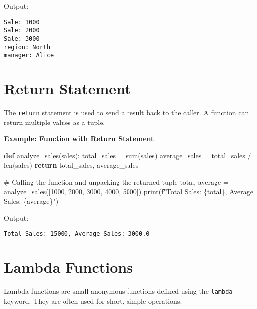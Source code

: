 \documentclass[
  letterpaper,
  DIV=11,
  numbers=noendperiod]{scrreprt}
\newenvironment{Shaded}{\begin{snugshade}}{\end{snugshade}}
\newcommand{\BuiltInTok}[1]{\textcolor[rgb]{0.00,0.23,0.31}{#1}}
\newcommand{\CommentTok}[1]{\textcolor[rgb]{0.37,0.37,0.37}{#1}}
\newcommand{\ControlFlowTok}[1]{\textcolor[rgb]{0.00,0.23,0.31}{\textbf{#1}}}
\newcommand{\DecValTok}[1]{\textcolor[rgb]{0.68,0.00,0.00}{#1}}
\newcommand{\KeywordTok}[1]{\textcolor[rgb]{0.00,0.23,0.31}{\textbf{#1}}}
\newcommand{\NormalTok}[1]{\textcolor[rgb]{0.00,0.23,0.31}{#1}}
\newcommand{\OperatorTok}[1]{\textcolor[rgb]{0.37,0.37,0.37}{#1}}
\newcommand{\SpecialCharTok}[1]{\textcolor[rgb]{0.37,0.37,0.37}{#1}}
\newcommand{\SpecialStringTok}[1]{\textcolor[rgb]{0.13,0.47,0.30}{#1}}
\begin{document}
Output:

\begin{verbatim}
Sale: 1000
Sale: 2000
Sale: 3000
region: North
manager: Alice
\end{verbatim}

\section{Return Statement}\label{return-statement}

The \texttt{return} statement is used to send a result back to the
caller. A function can return multiple values as a tuple.

\textbf{Example: Function with Return Statement}

\begin{Shaded}
\begin{Highlighting}[]
\KeywordTok{def}\NormalTok{ analyze\_sales(sales):}
\NormalTok{    total\_sales }\OperatorTok{=} \BuiltInTok{sum}\NormalTok{(sales)}
\NormalTok{    average\_sales }\OperatorTok{=}\NormalTok{ total\_sales }\OperatorTok{/} \BuiltInTok{len}\NormalTok{(sales)}
    \ControlFlowTok{return}\NormalTok{ total\_sales, average\_sales}

\CommentTok{\# Calling the function and unpacking the returned tuple}
\NormalTok{total, average }\OperatorTok{=}\NormalTok{ analyze\_sales([}\DecValTok{1000}\NormalTok{, }\DecValTok{2000}\NormalTok{, }\DecValTok{3000}\NormalTok{, }\DecValTok{4000}\NormalTok{, }\DecValTok{5000}\NormalTok{])}
\BuiltInTok{print}\NormalTok{(}\SpecialStringTok{f"Total Sales: }\SpecialCharTok{\{}\NormalTok{total}\SpecialCharTok{\}}\SpecialStringTok{, Average Sales: }\SpecialCharTok{\{}\NormalTok{average}\SpecialCharTok{\}}\SpecialStringTok{"}\NormalTok{)}
\end{Highlighting}
\end{Shaded}

Output:

\begin{verbatim}
Total Sales: 15000, Average Sales: 3000.0
\end{verbatim}

\section{Lambda Functions}\label{lambda-functions-1}

Lambda functions are small anonymous functions defined using the
\texttt{lambda} keyword. They are often used for short, simple
operations.
\end{document}
